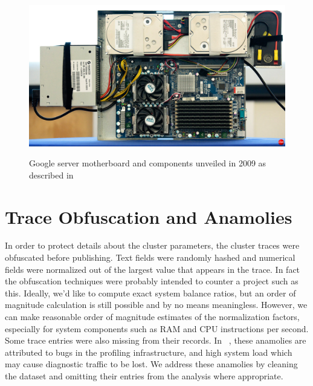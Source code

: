 \documentclass[a0,portrait]{a0poster}
\begin{document}
\begin{multicols}{2}
\begin{figure}
\centering
\includegraphics{GoogleServerLarge.jpg}
\label{google_server}
\caption{Google server motherboard and components unveiled in 2009 as described in ~\cite{googlehw}}
\end{figure}


\section*{Trace Obfuscation and Anamolies}

In order to protect details about the cluster parameters, the cluster traces were obfuscated before publishing.
Text fields were randomly hashed and numerical fields were normalized out of the largest value that appears in the trace.
In fact the obfuscation techniques were probably intended to counter a project such as this. 
Ideally, we'd like to compute exact system balance ratios, but an order of magnitude calculation is still possible and by no means meaningless. 
However, we can make reasonable order of magnitude estimates of the normalization factors, especially for system components such as RAM and CPU instructions per second. \\

Some trace entries were also missing from their records.
In ~\cite{clusterdata:Reiss2011}, these anamolies are attributed to bugs in the profiling infrastructure, and high system load which may cause diagnostic traffic to be lost.
We address these anamolies by cleaning the dataset and omitting their entries from the analysis where appropriate.


\end{multicols}
\end{document}
